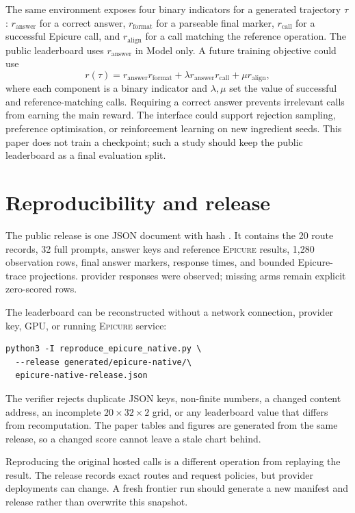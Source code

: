 \documentclass[10pt,twocolumn]{article}
\newcommand{\epicure}{\textsc{Epicure}}
\begin{document}
The same environment exposes four binary indicators for a generated trajectory $\tau$:
$r_{\mathrm{answer}}$ for a correct answer, $r_{\mathrm{format}}$ for a parseable final marker,
$r_{\mathrm{call}}$ for a successful Epicure call, and $r_{\mathrm{align}}$ for a call matching the
reference operation. The public leaderboard uses $r_{\mathrm{answer}}$ in Model only. A future
training objective could use
\begin{equation}
 r(\tau)=r_{\mathrm{answer}}r_{\mathrm{format}}
 +\lambda r_{\mathrm{answer}}r_{\mathrm{call}}
 +\mu r_{\mathrm{align}},
 \label{eq:reward}
\end{equation}
where each component is a binary indicator and $\lambda,\mu$ set the value of successful and
reference-matching calls. Requiring a correct answer prevents irrelevant calls from earning the
main reward. The interface could support rejection sampling, preference optimisation, or
reinforcement learning on new ingredient seeds. This paper does not train a checkpoint; such a
study should keep the public leaderboard as a final evaluation split.

\section{Reproducibility and release}
\label{sec:reproduction}

The public release is one JSON document with hash \FBReleaseSHA{}. It contains the 20 route records,
32 full prompts, answer keys and reference \epicure{} results, 1,280 observation rows, final answer
markers, response times, and bounded Epicure-trace projections. \FBObservedArms{} provider responses
were observed; \FBMissingArms{} missing arms remain explicit zero-scored rows.

The leaderboard can be reconstructed without a network connection, provider key, GPU, or running
\epicure{} service:

\begin{verbatim}
python3 -I reproduce_epicure_native.py \
  --release generated/epicure-native/\
  epicure-native-release.json
\end{verbatim}

The verifier rejects duplicate JSON keys, non-finite numbers, a changed content address, an
incomplete $20\times32\times2$ grid, or any leaderboard value that differs from recomputation. The
paper tables and figures are generated from the same release, so a changed score cannot leave a
stale chart behind.

Reproducing the original hosted calls is a different operation from replaying the result. The
release records exact routes and request policies, but provider deployments can change. A fresh
frontier run should generate a new manifest and release rather than overwrite this snapshot.
\end{document}
